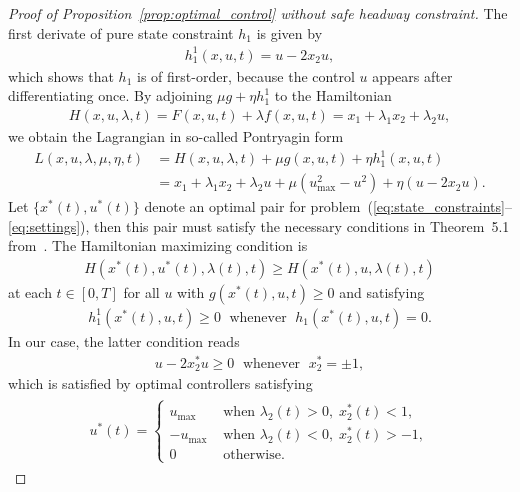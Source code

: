 \documentclass[a4paper]{article}
\theoremstyle{definition}
\theoremstyle{plain}
\begin{document}
\begin{proof}[Proof of Proposition~\ref{prop:optimal_control} without safe
  headway constraint]
The first derivate of pure state constraint $h_{1}$ is given by
\begin{align*}
  h_{1}^{1}(x, u, t) = u - 2x_{2} u ,
\end{align*}
which shows that $h_{1}$ is of first-order, because the control $u$ appears
after differentiating once.
%
By adjoining $\mu g + \eta h_{1}^{1}$ to the Hamiltonian
\begin{align*}
  H(x, u, \lambda, t) = F(x,u,t) + \lambda f(x,u,t) = x_{1} + \lambda_{1}x_{2} + \lambda_{2}u ,
\end{align*}
we obtain the Lagrangian in so-called Pontryagin form
\begin{align*}
  L(x, u, \lambda, \mu, \eta, t) &= H(x, u, \lambda, t) + \mu g(x, u, t) + \eta h_{1}^{1}(x, u, t) \\
  &= x_{1}  + \lambda_{1}x_{2} + \lambda_{2}u + \mu(u_{\max}^{2} - u^{2}) + \eta(u - 2x_{2}u) .
\end{align*}
%
Let $\{ x^{*}(t), u^{*}(t) \}$ denote an optimal pair for
problem~(\ref{eq:state_constraints}--\ref{eq:settings}), then this pair must
satisfy the necessary conditions in Theorem~5.1
from~\cite{hartlSurveyMaximumPrinciples1995}.
%
The Hamiltonian maximizing condition is
\begin{align*}
  H(x^{*}(t), u^{*}(t), \lambda(t), t) \geq H(x^{*}(t), u, \lambda(t), t)
\end{align*}
at each $t \in [0, T]$ for all $u$ with $g(x^{*}(t), u, t) \geq 0$ and satisfying
\begin{align*}
  h_{1}^{1}(x^{*}(t),u,t) \geq 0 \; \text{ whenever } \; h_{1}(x^{*}(t),u,t) = 0 .
\end{align*}
%
In our case, the latter condition reads
\begin{align*}
  u - 2x^{*}_{2}u \geq 0 \; \text{ whenever } \; x_{2}^{*} = \pm 1 ,
\end{align*}
%
which is satisfied by optimal controllers satisfying
\begin{align}
  \label{eq:optimal_u}
  \begin{split}
  u^{*}(t) =
  \begin{cases}
  u_{\max} &\text{ when } \lambda_{2}(t) > 0, \; x^{*}_{2}(t) < 1 , \\
  -u_{\max} &\text{ when } \lambda_{2}(t) < 0, \; x^{*}_{2}(t) > - 1 , \\
  0 &\text{ otherwise. }
  \end{cases}
  \end{split}
\end{align}


\end{proof}
\end{document}
